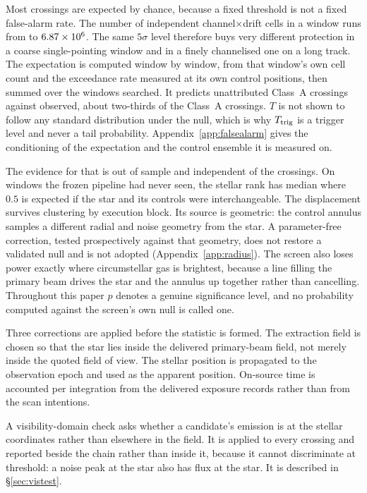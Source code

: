 Most crossings are expected by chance, because a fixed threshold is not a
fixed false-alarm rate. The number of independent channel$\times$drift
cells in a window runs from \TuCellsLo{} to $6.87 \times 10^{6}$. The same
$5\sigma$ level therefore buys very different protection in a coarse
single-pointing window and in a finely channelised one on a long track.
The expectation is computed window by window, from that window's own cell
count and the exceedance rate measured at its own control positions, then
summed over the windows searched. It predicts \RsevChanceExp{}
unattributed Class~A crossings against \RsevChanceObsAUnattr{} observed,
about two-thirds of the \NHitsA{} Class~A crossings. $T$ is not shown to
follow any standard distribution under the null, which is why $T_{\rm
trig}$ is a trigger level and never a tail probability.
Appendix~\ref{app:falsealarm} gives the conditioning of the expectation
and the control ensemble it is measured on.

\rankstatus{} The evidence for that is out of sample and independent of
the crossings. On \HoWin{} windows the frozen pipeline had never seen,
the stellar rank has median \HoRankMed{} where $0.5$ is expected if the
star and its controls were interchangeable. The displacement survives
clustering by execution block. Its source is geometric: the control annulus samples a
different radial and noise geometry from the star. A parameter-free
correction, tested prospectively against that geometry, does not restore
a validated null and is not adopted (Appendix~\ref{app:radius}). The
screen also loses power exactly where circumstellar gas is brightest,
because a line filling the primary beam drives the star and the annulus
up together rather than cancelling. Throughout this paper $p$ denotes a
genuine significance level, and no probability computed against the
screen's own null is called one.

Three corrections are applied before the statistic is formed. The
extraction field is chosen so that the star lies inside the delivered
primary-beam field, not merely inside the quoted field of view. The
stellar position is propagated to the observation epoch and used as the
apparent position. On-source time is accounted per integration from the
delivered exposure records rather than from the scan intentions.

A visibility-domain check asks whether a candidate's emission is at the
stellar coordinates rather than elsewhere in the field. It is applied to
every crossing and reported beside the chain rather than inside it,
because it cannot discriminate at threshold: a noise peak at the star
also has flux at the star. It is described in \S\ref{sec:vistest}.

